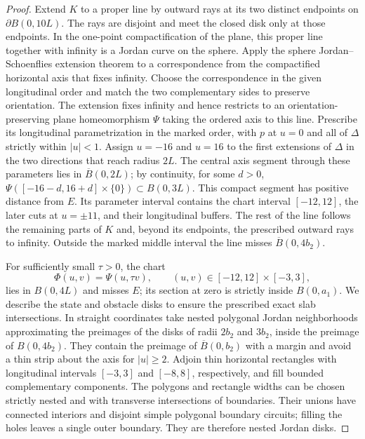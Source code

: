 \begin{proof}
Extend $K$ to a proper line by outward rays at its two distinct endpoints
on $\partial B(0,10L)$.  The rays are disjoint and meet the closed disk
only at those endpoints.  In the one-point compactification of the
plane, this proper line together with infinity is a Jordan curve on
the sphere.  Apply the sphere Jordan--Schoenflies extension theorem
\cite[Theorems~10.2--10.3, p.~71]{Moise1977} to a correspondence from
the compactified horizontal axis that fixes infinity.  Choose the
correspondence in the given longitudinal order and match the two
complementary sides to preserve orientation.  The extension fixes
infinity and hence restricts to an orientation-preserving plane
homeomorphism $\Psi$ taking the ordered axis to this line.  Prescribe
its longitudinal parametrization in the marked order, with $p$
at $u=0$ and all of $\Delta$ strictly within $|u|<1$.  Assign
$u=-16$ and $u=16$ to the first extensions of $\Delta$ in the
two directions that reach radius $2L$.  The central axis segment
through these parameters lies in $\overline B(0,2L)$; by
continuity, for some $d>0$,
$\Psi([-16-d,16+d]\times\{0\})\subset B(0,3L)$.
This compact segment has positive distance from $E$.  Its parameter
interval contains the chart interval $[-12,12]$, the later cuts
at $u=\pm11$, and their longitudinal buffers.
The rest of the line follows the remaining parts of $K$ and,
beyond its endpoints, the prescribed outward rays to infinity.
Outside the marked middle interval the line misses
$\overline B(0,4b_2)$.

For sufficiently small $\tau>0$, the chart
\[
             \Phi(u,v)=\Psi(u,\tau v),\qquad
             (u,v)\in[-12,12]\times[-3,3],
\]
lies in $B(0,4L)$ and misses $E$; its section at zero is strictly inside
$B(0,a_1)$.  We describe the state and obstacle disks to ensure the
prescribed exact slab intersections.  In straight coordinates take
nested polygonal Jordan neighborhoods approximating the preimages of
the disks of radii $2b_2$ and $3b_2$, inside the preimage of
$B(0,4b_2)$.  They contain the preimage of
$\overline B(0,b_2)$ with a margin and avoid a thin strip about the
axis for $|u|\ge2$.  Adjoin thin horizontal rectangles with longitudinal
intervals $[-3,3]$ and $[-8,8]$, respectively, and fill bounded
complementary components.  The polygons and rectangle widths can be
chosen strictly nested and with transverse intersections of boundaries.
Their unions have connected interiors and disjoint simple polygonal
boundary circuits; filling the holes leaves a single outer boundary.
They are therefore nested Jordan disks.


\end{proof}
